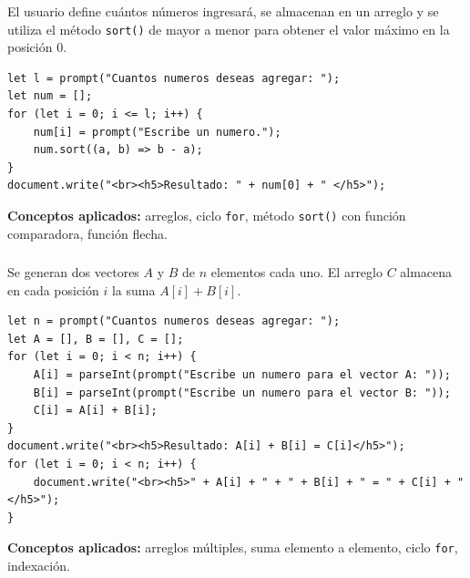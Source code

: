 \documentclass[10pt,a4paper]{article}
\begin{document}
\subsubsection{\color{colorESCOM}{Ejercicio 4: Mayor valor en un arreglo}}

El usuario define cuántos números ingresará, se almacenan en un arreglo y se utiliza el método \texttt{sort()} de mayor a menor para obtener el valor máximo en la posición 0.

\begin{lstlisting}[style=jsStyle, caption={Ejercicio 4 -- Mayor valor en arreglo}]
let l = prompt("Cuantos numeros deseas agregar: ");
let num = [];
for (let i = 0; i <= l; i++) {
    num[i] = prompt("Escribe un numero.");
    num.sort((a, b) => b - a);
}
document.write("<br><h5>Resultado: " + num[0] + " </h5>");
\end{lstlisting}

\textbf{Conceptos aplicados:} arreglos, ciclo \texttt{for}, método \texttt{sort()} con función comparadora, función flecha.

\subsubsection{\color{colorESCOM}{Ejercicio 5: Suma de vectores A y B}}

Se generan dos vectores $A$ y $B$ de $n$ elementos cada uno. El arreglo $C$ almacena en cada posición $i$ la suma $A[i] + B[i]$.

\begin{lstlisting}[style=jsStyle, caption={Ejercicio 5 -- Suma de vectores}]
let n = prompt("Cuantos numeros deseas agregar: ");
let A = [], B = [], C = [];
for (let i = 0; i < n; i++) {
    A[i] = parseInt(prompt("Escribe un numero para el vector A: "));
    B[i] = parseInt(prompt("Escribe un numero para el vector B: "));
    C[i] = A[i] + B[i];
}
document.write("<br><h5>Resultado: A[i] + B[i] = C[i]</h5>");
for (let i = 0; i < n; i++) {
    document.write("<br><h5>" + A[i] + " + " + B[i] + " = " + C[i] + "</h5>");
}
\end{lstlisting}

\textbf{Conceptos aplicados:} arreglos múltiples, suma elemento a elemento, ciclo \texttt{for}, indexación.

\subsubsection{\color{colorESCOM}{Ejercicio 6: Media aritmética}}
\end{document}
